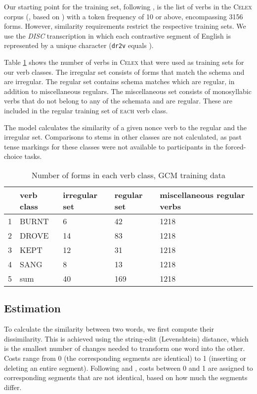 \documentclass[12pt]{article}
\begin{document}
Our starting point for the training set, following \cite{albright2003rules}, is the list of verbs in the \textsc{Celex} corpus (\citealt{baayen1993celex}, based on \citealt{sinclair1987}) with a token frequency of 10 or above, encompassing 3156 forms. However, similarity requirements restrict the respective training sets. We use the {\em DISC} transcription in which each contrastive segment of English is represented by a unique character (\texttt{dr2v} equals \textipa{[draIv]}).

Table \ref{gcmsetsize} shows the number of verbs in \textsc{Celex} that were used as training sets for our verb classes. The irregular set consists of forms that match the schema and are irregular. The regular set contains schema matches which are regular, in addition to miscellaneous regulars. The miscellaneous set consists of monosyllabic verbs that do not belong to any of the schemata and are regular. These are included in the regular training set of \textsc{ each} verb class. 

The model calculates the similarity of a given nonce verb to the regular and the irregular set. Comparisons to stems in other classes are not calculated, as past tense markings for these classes were not available to participants in the forced-choice tasks.

\begin{table}[ht]
\centering
\begin{tabular}{rllll}
  \hline
 & verb class & irregular set & regular set & miscellaneous regular verbs \\ 
  \hline
1 & BURNT & 6 & 42 & 1218 \\ 
  2 & DROVE & 14 & 83 & 1218 \\ 
  3 & KEPT & 12 & 31 & 1218 \\ 
  4 & SANG & 8 & 13 & 1218 \\ 
  5 & sum & 40 & 169 & 1218 \\ 
   \hline
\end{tabular}
\caption{Number of forms in each verb class, GCM training data} 
\label{gcmsetsize}
\end{table}
\subsection{Estimation}

To calculate the similarity between two words, we first compute their dissimilarity. This is achieved using the string-edit (Levenshtein) distance, which is the smallest number of changes needed to transform one word into the other. Costs range from 0 (the corresponding segments are identical) to 1 (inserting or deleting an entire segment). Following \cite{albright2003rules} and \cite{dawdy2014learnability}, costs between 0 and 1 are assigned to corresponding segments that are not identical, based on how much the segments differ. 
\end{document}
